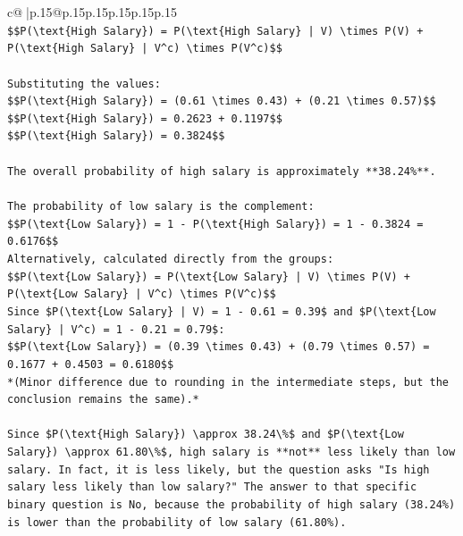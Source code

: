 \documentclass{article}
\begin{document}
{\begin{supertabular}{c@{$\;$}|p{.15\linewidth}@{}p{.15\linewidth}p{.15\linewidth}p{.15\linewidth}p{.15\linewidth}p{.15\linewidth}}
{{{\\ 
\texttt{\$\$P(\textbackslash{}text\{High Salary\}) = P(\textbackslash{}text\{High Salary\} | V) \textbackslash{}times P(V) + P(\textbackslash{}text\{High Salary\} | V\^{}c) \textbackslash{}times P(V\^{}c)\$\$} \\
\\ 
\texttt{Substituting the values:} \\
\texttt{\$\$P(\textbackslash{}text\{High Salary\}) = (0.61 \textbackslash{}times 0.43) + (0.21 \textbackslash{}times 0.57)\$\$} \\
\texttt{\$\$P(\textbackslash{}text\{High Salary\}) = 0.2623 + 0.1197\$\$} \\
\texttt{\$\$P(\textbackslash{}text\{High Salary\}) = 0.3824\$\$} \\
\\ 
\texttt{The overall probability of high salary is approximately **38.24\%**.} \\
\\ 
\texttt{The probability of low salary is the complement:} \\
\texttt{\$\$P(\textbackslash{}text\{Low Salary\}) = 1 {-} P(\textbackslash{}text\{High Salary\}) = 1 {-} 0.3824 = 0.6176\$\$} \\
\texttt{Alternatively, calculated directly from the groups:} \\
\texttt{\$\$P(\textbackslash{}text\{Low Salary\}) = P(\textbackslash{}text\{Low Salary\} | V) \textbackslash{}times P(V) + P(\textbackslash{}text\{Low Salary\} | V\^{}c) \textbackslash{}times P(V\^{}c)\$\$} \\
\texttt{Since \$P(\textbackslash{}text\{Low Salary\} | V) = 1 {-} 0.61 = 0.39\$ and \$P(\textbackslash{}text\{Low Salary\} | V\^{}c) = 1 {-} 0.21 = 0.79\$:} \\
\texttt{\$\$P(\textbackslash{}text\{Low Salary\}) = (0.39 \textbackslash{}times 0.43) + (0.79 \textbackslash{}times 0.57) = 0.1677 + 0.4503 = 0.6180\$\$} \\
\texttt{*(Minor difference due to rounding in the intermediate steps, but the conclusion remains the same).*} \\
\\ 
\texttt{Since \$P(\textbackslash{}text\{High Salary\}) \textbackslash{}approx 38.24\textbackslash{}\%\$ and \$P(\textbackslash{}text\{Low Salary\}) \textbackslash{}approx 61.80\textbackslash{}\%\$, high salary is **not** less likely than low salary. In fact, it is less likely, but the question asks "Is high salary less likely than low salary?" The answer to that specific binary question is No, because the probability of high salary (38.24\%) is lower than the probability of low salary (61.80\%).} \\
}}}
\end{supertabular}}
\end{document}
